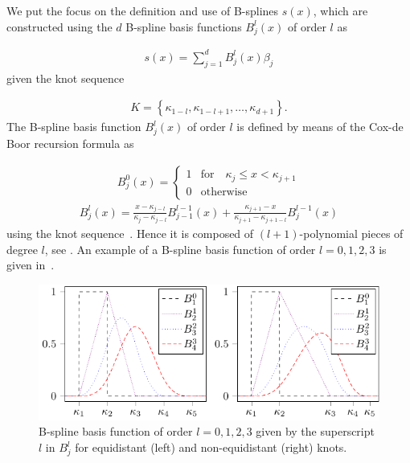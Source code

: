 We put the focus on the definition and use of B-splines $s(x)$, which are constructed using the $d$ B-spline basis functions $B_j^l(x)$ of order $l$ as

\begin{align}
	s(x) = \sum_{j=1}^d B_j^l(x) \beta_j 
\end{align}
%
given the knot sequence 

\begin{align} \label{eq:knot-sequence}
	K = \left\{\kappa_{1-l}, \kappa_{1-l+1}, \dots, \kappa_{d+1}\right\}.
\end{align}
%
The B-spline basis function $B_j^l(x)$ of order $l$ is defined by means of the Cox-de Boor recursion formula as

\begin{align} \label{eq:Bspline_recDef1}
	B_j^0(x) = \begin{cases} 1 & \text{for} \quad \kappa_j \le x < \kappa_{j+1} \\ 
					 		 0 & \text{otherwise} 
	\end{cases}
\end{align}
\begin{align} \label{eq:Bspline_recDef2}
	B_j^l(x) = \frac{x - \kappa_{j-l}}{\kappa_{j} - \kappa_{j-l}} B_{j-1}^{l-1}(x) + \frac{\kappa_{j+1} - x}{\kappa_{j+1} - \kappa_{j+1-l}} B_{j}^{l-1}(x)
\end{align}
%
using the knot sequence~. Hence it is composed of $(l+1)$-polynomial pieces of degree $l$, see \cite{fahrmeir2007regression}. An example of a B-spline basis function of order $l=0, 1, 2, 3$ is given in~. 

\begin{figure}[H]
	\centering
	\includegraphics{graphics/pgfplots/cha2/spline-types.pdf}
	\caption[B-spline basis functions of order $l=0,1,2,3$]{B-spline basis function of order $l=0, 1, 2, 3$ given by the superscript $l$ in $B_j^l$ for equidistant (left) and non-equidistant (right) knots.}
	\label{fig:spline-types-both}
\end{figure}

